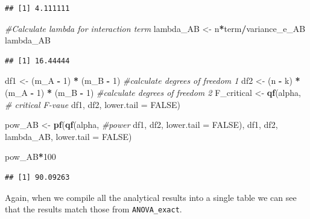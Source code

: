 \documentclass[
]{book}
\newenvironment{Shaded}{\begin{snugshade}}{\end{snugshade}}
\newcommand{\CommentTok}[1]{\textcolor[rgb]{0.56,0.35,0.01}{\textit{#1}}}
\newcommand{\DataTypeTok}[1]{\textcolor[rgb]{0.13,0.29,0.53}{#1}}
\newcommand{\DecValTok}[1]{\textcolor[rgb]{0.00,0.00,0.81}{#1}}
\newcommand{\KeywordTok}[1]{\textcolor[rgb]{0.13,0.29,0.53}{\textbf{#1}}}
\newcommand{\NormalTok}[1]{#1}
\newcommand{\OperatorTok}[1]{\textcolor[rgb]{0.81,0.36,0.00}{\textbf{#1}}}
\newcommand{\OtherTok}[1]{\textcolor[rgb]{0.56,0.35,0.01}{#1}}
\newcommand{\StringTok}[1]{\textcolor[rgb]{0.31,0.60,0.02}{#1}}
\begin{document}
\begin{verbatim}
## [1] 4.111111
\end{verbatim}

\begin{Shaded}
\begin{Highlighting}[]
\CommentTok{#Calculate lambda for interaction term}
\NormalTok{lambda_AB <-}\StringTok{ }\NormalTok{n}\OperatorTok{*}\NormalTok{term}\OperatorTok{/}\NormalTok{variance_e_AB}
\NormalTok{lambda_AB}
\end{Highlighting}
\end{Shaded}

\begin{verbatim}
## [1] 16.44444
\end{verbatim}

\begin{Shaded}
\begin{Highlighting}[]
\NormalTok{df1 <-}\StringTok{ }\NormalTok{(m_A }\OperatorTok{-}\StringTok{ }\DecValTok{1}\NormalTok{) }\OperatorTok{*}\StringTok{ }\NormalTok{(m_B }\OperatorTok{-}\StringTok{ }\DecValTok{1}\NormalTok{)  }\CommentTok{#calculate degrees of freedom 1}
\NormalTok{df2 <-}
\NormalTok{(n }\OperatorTok{-}\StringTok{ }\NormalTok{k) }\OperatorTok{*}\StringTok{ }\NormalTok{(m_A }\OperatorTok{-}\StringTok{ }\DecValTok{1}\NormalTok{) }\OperatorTok{*}\StringTok{ }\NormalTok{(m_B }\OperatorTok{-}\StringTok{ }\DecValTok{1}\NormalTok{) }\CommentTok{#calculate degrees of freedom 2}
\NormalTok{F_critical <-}\StringTok{ }\KeywordTok{qf}\NormalTok{(alpha, }\CommentTok{# critical F-vaue}
\NormalTok{df1,}
\NormalTok{df2,}
\DataTypeTok{lower.tail =} \OtherTok{FALSE}\NormalTok{)}

\NormalTok{pow_AB <-}\StringTok{ }\KeywordTok{pf}\NormalTok{(}\KeywordTok{qf}\NormalTok{(alpha, }\CommentTok{#power}
\NormalTok{df1,}
\NormalTok{df2,}
\DataTypeTok{lower.tail =} \OtherTok{FALSE}\NormalTok{),}
\NormalTok{df1,}
\NormalTok{df2,}
\NormalTok{lambda_AB,}
\DataTypeTok{lower.tail =} \OtherTok{FALSE}\NormalTok{)}

\NormalTok{pow_AB}\OperatorTok{*}\DecValTok{100}
\end{Highlighting}
\end{Shaded}

\begin{verbatim}
## [1] 90.09263
\end{verbatim}

Again, when we compile all the analytical results into a single table we can see that the results match those from \texttt{ANOVA\_exact}.
\end{document}

